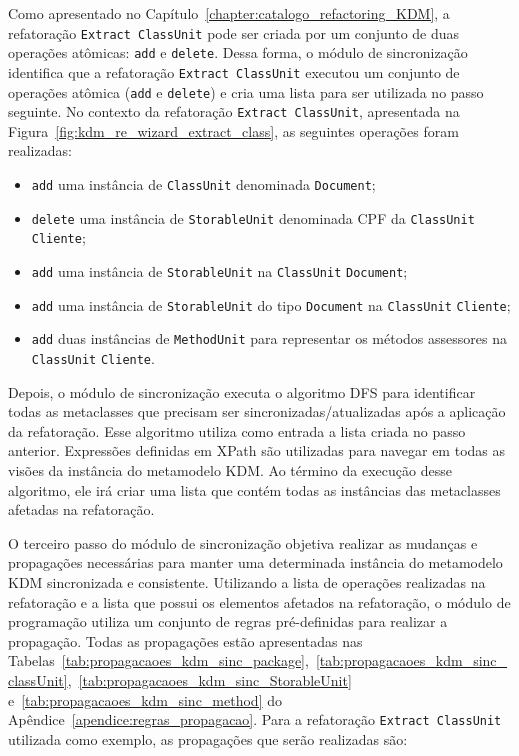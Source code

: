 Como apresentado no Capítulo~\ref{chapter:catalogo_refactoring_KDM}, a refatoração \texttt{Extract ClassUnit} pode ser criada por um conjunto de duas operações atômicas: \texttt{add} e  \texttt{delete}. Dessa forma, o módulo de sincronização identifica que a refatoração \texttt{Extract ClassUnit} executou um conjunto de operações atômica (\texttt{add} e \texttt{delete}) e cria uma lista para ser utilizada no passo seguinte. No contexto da refatoração \texttt{Extract ClassUnit}, apresentada na Figura~\ref{fig:kdm_re_wizard_extract_class}, as seguintes operações foram realizadas: 

\begin{itemize}

\item \texttt{add} uma instância de \texttt{ClassUnit} denominada \texttt{Document};

\item \texttt{delete} uma instância de \texttt{StorableUnit} denominada CPF da \texttt{ClassUnit} \texttt{Cliente};

\item \texttt{add} uma instância de \texttt{StorableUnit} na \texttt{ClassUnit} \texttt{Document};

\item \texttt{add} uma instância de \texttt{StorableUnit} do tipo \texttt{Document} na \texttt{ClassUnit} \texttt{Cliente};

\item \texttt{add} duas instâncias de \texttt{MethodUnit} para representar os métodos assessores na \texttt{ClassUnit} \texttt{Cliente}.
\end{itemize}

Depois, o módulo de sincronização executa o algoritmo DFS para identificar todas as metaclasses que precisam ser sincronizadas/atualizadas após a aplicação da refatoração. Esse algoritmo utiliza como entrada a lista criada no passo anterior. Expressões definidas em XPath são utilizadas para navegar em todas as visões da instância do metamodelo KDM. Ao término da execução desse algoritmo, ele irá criar uma lista que contém todas as instâncias das metaclasses afetadas na refatoração. 
   

O terceiro passo do módulo de sincronização objetiva realizar as mudanças e propagações necessárias para manter uma determinada instância do metamodelo KDM sincronizada e consistente. Utilizando a lista de operações realizadas na refatoração e a lista que possui os elementos afetados na refatoração, o módulo de programação utiliza um conjunto de regras pré-definidas para realizar a propagação. Todas as propagações estão apresentadas nas Tabelas~\ref{tab:propagacaoes_kdm_sinc_package},~\ref{tab:propagacaoes_kdm_sinc_classUnit},~\ref{tab:propagacaoes_kdm_sinc_StorableUnit} e~\ref{tab:propagacaoes_kdm_sinc_method} do Apêndice~\ref{apendice:regras_propagacao}. Para a refatoração \texttt{Extract ClassUnit} utilizada como exemplo, as propagações que serão realizadas são:

